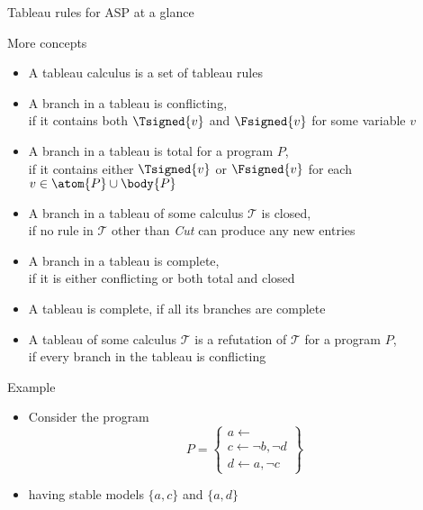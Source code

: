 \begin{frame}{Tableau rules for ASP at a glance}
  \vspace*{-5mm}
  
\end{frame}
\begin{frame}[c]{More concepts}
  \begin{itemize}
  \item <1-> A \alert{tableau calculus} is a set of tableau rules
  \item <2-> A branch in a tableau is \alert{conflicting},\\
    if it contains both $\Tsigned{v}$ and $\Fsigned{v}$ for some variable $v$
  \item <3-> A branch in a tableau is \alert{total} for a program $P$,\\
    if it contains either $\Tsigned{v}$ or $\Fsigned{v}$ for each $v \in \atom{P} \cup \body{P}$
  \item <4-> A branch in a tableau of some calculus $\mathcal{T}$ is \alert{closed},\\
    if no rule in $\mathcal{T}$ other than \textit{Cut} can produce any new entries
  \item <5-> A branch in a tableau is \alert{complete},\\
    if it is either conflicting or both total and closed
  \item <6-> A tableau is \alert{complete}, if all its branches are complete
  \item <7-> A tableau of some calculus $\mathcal{T}$ is a \alert{refutation} of $\mathcal{T}$ for a program $P$,\\
    if every branch in the tableau is conflicting
  \end{itemize}
\end{frame}
\begin{frame}{Example}
  \begin{itemize}
  \item Consider the program
    \[
    P
    =
    \left\{
      \begin{array}{l}
        a\leftarrow\\
        c\leftarrow \neg b, \neg d\\
        d\leftarrow a, \neg c
      \end{array}
    \right\}
    \]
  \item [] having stable models $\{a,c\}$ and $\{a,d\}$
  \end{itemize}
\end{frame}
